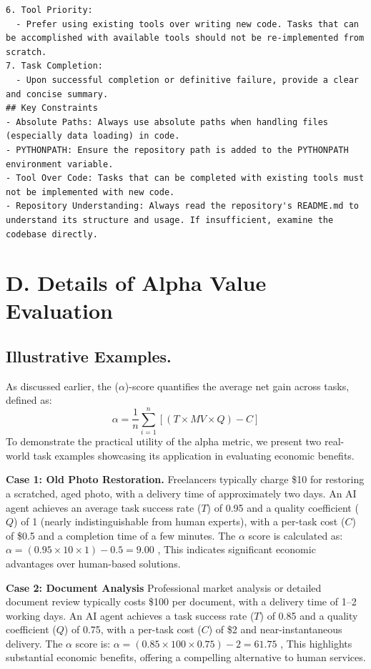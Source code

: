 \begin{lstlisting}[language={},caption={Prompt Template for Tasks.},label={lst:task-prompt}]
6. Tool Priority:
  - Prefer using existing tools over writing new code. Tasks that can be accomplished with available tools should not be re-implemented from scratch.
7. Task Completion:
  - Upon successful completion or definitive failure, provide a clear and concise summary.
## Key Constraints
- Absolute Paths: Always use absolute paths when handling files (especially data loading) in code.
- PYTHONPATH: Ensure the repository path is added to the PYTHONPATH environment variable.
- Tool Over Code: Tasks that can be completed with existing tools must not be implemented with new code.
- Repository Understanding: Always read the repository's README.md to understand its structure and usage. If insufficient, examine the codebase directly.
\end{lstlisting}


\section*{D. Details of Alpha Value Evaluation}
\label{appendix:alpha}

\subsection*{Illustrative Examples.}
As discussed earlier, the ($\alpha$)-score quantifies the average net gain across tasks, defined as: 
\begin{equation}
\alpha=\frac{1}{n} \sum_{i=1}^{n} \left [(T\times MV\times Q)- C \right ] 
\end{equation}
To demonstrate the practical utility of the alpha metric, we present two real-world task examples showcasing its application in evaluating economic benefits.

\textbf{Case 1: Old Photo Restoration.}
Freelancers typically charge \$10 for restoring a scratched, aged photo, with a delivery time of approximately two days. An AI agent achieves an average task success rate ($T$) of 0.95 and a quality coefficient ($Q$) of 1 (nearly indistinguishable from human experts), with a per-task cost ($C$) of \$0.5 and a completion time of a few minutes. The \(\alpha\) score is calculated as:
$\alpha = (0.95 \times 10 \times 1) - 0.5 = 9.00$ , 
This indicates significant economic advantages over human-based solutions.

\textbf{Case 2: Document Analysis}
Professional market analysis or detailed document review typically costs \$100 per document, with a delivery time of 1–2 working days. An AI agent achieves a task success rate ($T$) of 0.85 and a quality coefficient ($Q$) of 0.75, with a per-task cost ($C$) of \$2 and near-instantaneous delivery. The \(\alpha\) score is:
$\alpha = (0.85 \times 100 \times 0.75) - 2 = 61.75$ ,
This highlights substantial economic benefits, offering a compelling alternative to human services.

